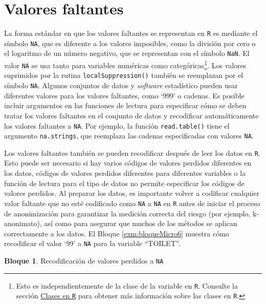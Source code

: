 \documentclass[]{book}
\theoremstyle{definition}
\theoremstyle{definition}
\newtheorem{example}{Bloque}[chapter]
\theoremstyle{definition}
\theoremstyle{definition}
\theoremstyle{remark}
\begin{document}
\hypertarget{valores-faltantes}{%
\section{Valores faltantes}\label{valores-faltantes}}

La forma estándar en que los valores faltantes se representan en \texttt{R} es mediante el símbolo \texttt{NA}, que es diferente a los valores imposibles, como la división por cero o el logaritmo de un número negativo, que se representan con el símbolo \texttt{NaN}. El valor \texttt{NA} se usa tanto para variables numéricas como categóricas\footnote{Esto es independientemente de la clase de la variable en \texttt{R}. Consulte la sección \protect\hyperlink{clases-en-r}{Clases en \texttt{R}} para obtener más información sobre las clases en \texttt{R}.}. Los valores suprimidos por la rutina \texttt{localSuppression()} también se reemplazan por el símbolo \texttt{NA}. Algunos conjuntos de datos y \emph{software} estadístico pueden usar diferentes valores para los valores faltantes, como `999' o cadenas. Es posible incluir argumentos en las funciones de lectura para especificar cómo se deben tratar los valores faltantes en el conjunto de datos y recodificar automáticamente los valores faltantes a \texttt{NA}. Por ejemplo, la función \texttt{read.table()} tiene el argumento \texttt{na.strings}, que reemplaza las cadenas especificadas con valores \texttt{NA}.

Los valores faltantes también se pueden recodificar después de leer los datos en \texttt{R}. Esto puede ser necesario si hay varios códigos de valores perdidos diferentes en los datos, códigos de valores perdidos diferentes para diferentes variables o la función de lectura para el tipo de datos no permite especificar los códigos de valores perdidos. Al preparar los datos, es importante volver a codificar cualquier valor faltante que no esté codificado como \texttt{NA} a \texttt{NA} en \texttt{R} antes de iniciar el proceso de anonimización para garantizar la medición correcta del riesgo (por ejemplo, k-anonimato), así como para asegurar que muchos de los métodos se aplican correctamente a los datos. El Bloque \ref{exm:bloqueMicro6} muestra cómo recodificar el valor `99' a \texttt{NA} para la variable ``TOILET''.

\begin{example}
\protect\hypertarget{exm:bloqueMicro6}{}{\label{exm:bloqueMicro6} }Recodificación de valores perdidos a \texttt{NA}
\end{example}
\end{document}
